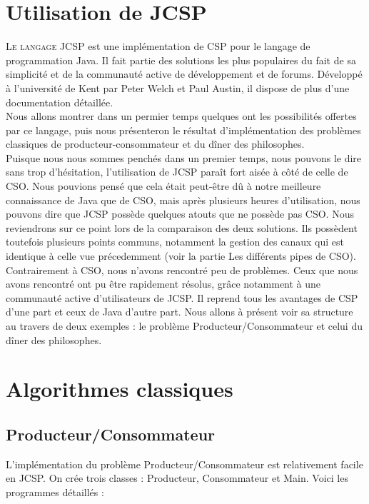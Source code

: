 \documentclass[a4paper,11pt,french]{report}
\begin{document}
\section{Utilisation de JCSP}

\lettrine{L}{e langage} JCSP est une implémentation de CSP pour le langage de programmation Java. Il fait partie des solutions les plus populaires du fait de sa simplicité et de la communauté active de développement et de forums. Développé à l'université de Kent par Peter Welch et Paul Austin, il dispose de plus d'une documentation détaillée.\\

Nous allons montrer dans un permier temps quelques ont les possibilités offertes par ce langage, puis nous présenteron le résultat d'implémentation des problèmes classiques de producteur-consommateur et du dîner des philosophes.\\

Puisque nous nous sommes penchés dans un premier temps, nous pouvons le dire sans trop d'hésitation, l'utilisation de JCSP paraît fort aisée à côté de celle de CSO. Nous pouvions pensé que cela était peut-être dû à notre meilleure connaissance de Java que de CSO, mais après plusieurs heures d'utilisation, nous pouvons dire que JCSP possède quelques atouts que ne possède pas CSO. Nous reviendrons sur ce point lors de la comparaison des deux solutions.
Ils possèdent toutefois plusieurs points communs, notamment la gestion des canaux qui est identique à celle vue précedemment (voir la partie Les différents pipes de CSO).
Contrairement à CSO, nous n'avons rencontré peu de problèmes. Ceux que nous avons rencontré ont pu être rapidement résolus, grâce notamment à une communauté active d'utilisateurs de JCSP. Il reprend tous les avantages de CSP d'une part et ceux de Java d'autre part. Nous allons à présent voir sa structure au travers de deux exemples : le problème Producteur/Consommateur et celui du dîner des philosophes.

\section{Algorithmes classiques}
\subsection{Producteur/Consommateur}

L'implémentation du problème Producteur/Consommateur est relativement facile en JCSP. On crée trois classes : Producteur, Consommateur et Main. Voici les programmes détaillés :
\end{document}

